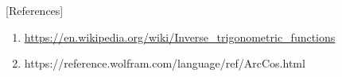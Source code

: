 \documentclass[12pt]{article}
\begin{document}
\newpage

\vspace{\baselineskip}[References]\par

\begin{enumerate}
	\item \href{https://en.wikipedia.org/wiki/Inverse_trigonometric_functions}{https://en.wikipedia.org/wiki/Inverse\_trigonometric\_functions}\par

	\item https://reference.wolfram.com/language/ref/ArcCos.html
\end{enumerate}\par


\vspace{\baselineskip}

\printbibliography
\end{document}
